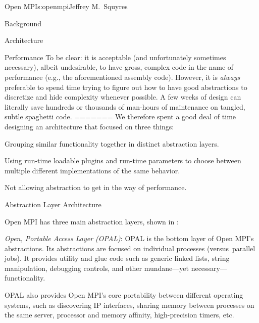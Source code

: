 \begin{aosachapter}{Open MPI}{s:openmpi}{Jeffrey M.\ Squyres}
\begin{aosasect1}{Background}
\begin{aosasect1}{Architecture}
\begin{aosasect2}{Performance}
To be clear: it is acceptable (and unfortunately sometimes necessary),
albeit undesirable, to have gross, complex code in the name of
performance (e.g., the aforementioned assembly code).  However, it is
{\em always} preferable to spend time trying to figure out how to have
good abstractions to discretize and hide complexity whenever possible.
A few weeks of design can literally save hundreds or thousands of
man-hours of maintenance on tangled, subtle spaghetti code.
=======
\noindent We therefore spent a good deal of time designing an architecture that
focused on three things:

\begin{aosaenumerate}
\item Grouping similar functionality together in distinct abstraction
  layers.
\item Using run-time loadable plugins and run-time parameters to
  choose between multiple different implementations of the same
  behavior.
\item Not allowing abstraction to get in the way of performance.
\end{aosaenumerate}


\begin{aosasect2}{Abstraction Layer Architecture}


\noindent Open MPI has three main abstraction layers, shown in
:

\begin{aosaitemize}
\item \emph{Open, Portable Access Layer (OPAL)}: OPAL is the bottom
  layer of Open MPI's abstractions.  Its abstractions are focused on
  individual processes (versus\ parallel jobs).  It provides utility and
  glue code such as generic linked lists, string manipulation,
  debugging controls, and other mundane---yet necessary---functionality.

  OPAL also provides Open MPI's core portability between different
  operating systems, such as discovering IP interfaces, sharing
  memory between processes on the same server, processor and memory
  affinity, high-precision timers, etc.


\end{aosaitemize}
\end{aosasect2}
\end{aosasect2}
\end{aosasect1}
\end{aosasect1}
\end{aosachapter}
